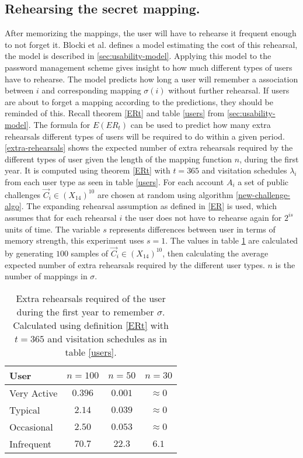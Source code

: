 \subsection{Rehearsing the secret mapping.}
After memorizing the mappings, the user will have to rehearse it frequent enough to not forget it. Blocki et al. \cite{naturally-rehearsing} defines a model estimating the cost of this rehearsal, the model is described in \autoref{sec:usability-model}. Applying this model to the password management scheme gives insight to how much different types of users have to rehearse. The model predicts how long a user will remember a association between $i$ and corresponding mapping $\sigma(i)$ without further rehearsal. If users are about to forget a mapping according to the predictions, they should be reminded of this. Recall theorem \ref{ERt} and table \ref{users} from \autoref{sec:usability-model}. The formula for $E(ER_t)$ can be used to predict how many extra rehearsals different types of users will be required to do within a given period. \autoref{extra-rehearsals} shows the expected number of extra rehearsals required by the different types of user given the length of the mapping function $n$, during the first year. It is computed using theorem \ref{ERt} with $t=365$ and visitation schedules $\lambda_i$ from each user type as seen in table \ref{users}. For each account $A_i$ a set of public challenges $\vec C_i \in (X_{14})^{10}$ are chosen at random using algorithm \ref{new-challenge-algo}. The expanding rehearsal assumption as defined in \ref{ER} is used, which assumes that for each rehearsal $i$ the user does not have to rehearse again for $2^{is}$ units of time. The variable $s$ represents differences between user in terms of memory strength, this experiment uses $s=1$. The values in table \ref{extra-rehearsals} are calculated by generating $100$ samples of $\vec C_i \in (X_{14})^{10}$, then calculating the average expected number of extra rehearsals required by the different user types. $n$ is the number of mappings in $\sigma$.

\begin{table}
    \centering
    \begin{tabular}{ |l|c|c|c| }
        \hline
        User & $n=100$ & $n=50$ & $n=30$ \\
        \hline \hline
        Very Active & $0.396$ & $0.001$ & $\approx 0$ \\
        \hline
        Typical & $2.14$ & $0.039$ & $\approx 0$ \\
        \hline
        Occasional & $2.50$ & $0.053$ & $\approx 0 $  \\
        \hline
        Infrequent & $70.7$ & $22.3$ & $6.1$ \\
        \hline

    \end{tabular}
    \caption{\cite{hcp-blocki} Extra rehearsals required of the user during the first year to remember $\sigma$. Calculated using definition \ref{ERt} with $t=365$ and visitation schedules as in table \ref{users}.}
    \label{extra-rehearsals}
\end{table}

